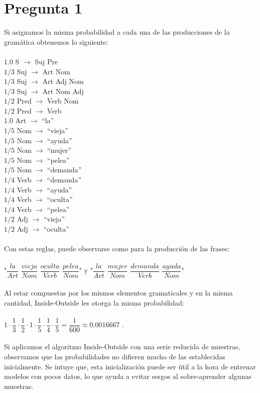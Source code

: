 \documentclass[12pt]{article}
\begin{document}
\section*{Pregunta 1}
Si asignamos la misma probabilidad a cada una de las producciones de la gramática obtenemos lo siguiente:
\\\\
$1.0$ S $\rightarrow$  Suj Pre \\
$1/3$ Suj $\rightarrow$ Art Nom \\
$1/3$ Suj $\rightarrow$ Art Adj Nom \\
$1/3$ Suj $\rightarrow$ Art Nom Adj \\
$1/2$ Pred $\rightarrow$ Verb Nom \\
$1/2$ Pred $\rightarrow$ Verb \\
$1.0$ Art $\rightarrow$ “la” \\
$1/5$ Nom $\rightarrow$ “vieja” \\
$1/5$ Nom $\rightarrow$ “ayuda” \\
$1/5$ Nom $\rightarrow$ “mujer” \\
$1/5$ Nom $\rightarrow$ “pelea” \\
$1/5$ Nom $\rightarrow$ “demanda” \\
$1/4$ Verb $\rightarrow$ “demanda” \\
$1/4$ Verb $\rightarrow$ “ayuda” \\
$1/4$ Verb $\rightarrow$ “oculta” \\
$1/4$ Verb $\rightarrow$ “pelea” \\
$1/2$ Adj $\rightarrow$ “vieja” \\
$1/2$ Adj $\rightarrow$ “oculta” 
\\\\
Con estas reglas, puede observarse como para la producción de las frases:  \\\\
"$\dfrac{la}{Art}$ $\dfrac{vieja}{Nom}$ $\dfrac{oculta}{Verb}$ $\dfrac{pelea}{Nom}$" y "$\dfrac{la}{Art}$ $\dfrac{mujer}{Nom}$ $\dfrac{demanda}{Verb}$ $\dfrac{ayuda}{Nom}$" \\\\
Al estar compuestas por los mismos elementos gramaticales y en la misma cantidad, Inside-Outside les otorga la misma probabilidad: \\
\\
$ 1 \cdot \dfrac{1}{3} \cdot \dfrac{1}{2} \cdot 1 \cdot \dfrac{1}{5} \cdot \dfrac{1}{4} \cdot \dfrac{1}{5} = \dfrac{1}{600} \approx 0.0016667 $ .
~\\
\\
Si aplicamos el algoritmo Inside-Outside con una serie reducida de muestras, observamos que las probabilidades no difieren mucho de las establecidas inicialmente. Se intuye que, esta inicialización puede ser útil a la hora de entrenar modelos con pocos datos, lo que ayuda a evitar sesgos al sobre-aprender algunas muestras.
\newpage
\end{document}
